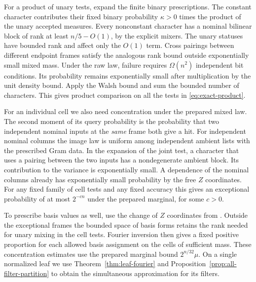 For a product of unary tests, expand the finite binary prescriptions.
The constant character contributes their fixed binary probability
\(\kappa>0\) times the product of the unary accepted measures.
Every nonconstant character has a nominal bilinear block of rank at least
\(n/5-O(1)\), by the explicit mixers. The unary statuses have bounded
rank and affect only the \(O(1)\) term. Cross pairings between different
endpoint frames satisfy the analogous rank bound outside exponentially
small mixed mass. Under the raw law, failure requires
\(\Omega(n^2)\) independent bit conditions. Its probability remains
exponentially small after multiplication by the unit density bound. Apply the Walsh bound and sum the
bounded number of characters. This gives product comparison on all the
tests in \eqref{eq:exact-product}.

For an individual cell we also need concentration under the prepared
mixed law. The second moment of its query probability is the probability
that two independent nominal inputs at the \emph{same} frame both give
a hit. For independent nominal columns the image law is uniform among independent ambient lists with the
prescribed Gram data. In the expansion of the joint test, a character
that uses a pairing between the two inputs has a nondegenerate ambient
block. Its contribution to the variance is exponentially small. A
dependence of the nominal columns already has exponentially small
probability by the free \(Z\) coordinates. For any fixed family of
cell tests and any fixed accuracy this gives an exceptional probability
of at most \(2^{-cn}\) under the prepared marginal, for some \(c>0\).

To prescribe basis values as well, use the change of \(Z\) coordinates
from . Outside the exceptional frames the bounded
space of basis forms retains the rank needed for unary mixing in the
cell tests. Fourier inversion then gives a fixed positive proportion
for each allowed basis assignment on the cells of sufficient mass.
These concentration estimates use the prepared marginal bound
\(2^{n/32}\mu\). On a single normalized leaf we use
Theorem~\ref{thm:leaf-fourier} and Proposition~\ref{prop:all-filter-partition}
to obtain the simultaneous approximation for its filters.
